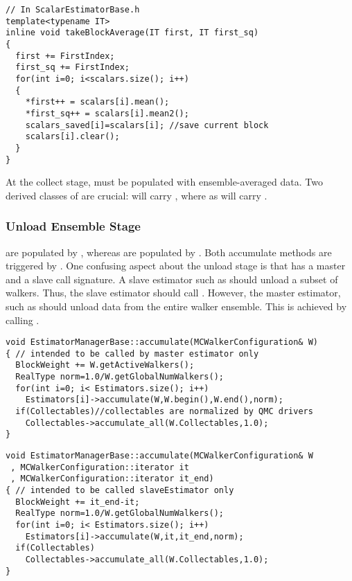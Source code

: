 \begin{lstlisting}
// In ScalarEstimatorBase.h
template<typename IT>
inline void takeBlockAverage(IT first, IT first_sq)
{
  first += FirstIndex;
  first_sq += FirstIndex;
  for(int i=0; i<scalars.size(); i++)
  {
    *first++ = scalars[i].mean();
    *first_sq++ = scalars[i].mean2();
    scalars_saved[i]=scalars[i]; //save current block
    scalars[i].clear();
  }
}
\end{lstlisting}

At the collect stage,  must be populated with ensemble-averaged data. Two derived classes of  are crucial:  will carry , where as  will carry .

\subsubsection{Unload Ensemble Stage}
 are populated by
, whereas
 are populated by
 . Both
accumulate methods are triggered by
. One confusing aspect about
the unload stage is that  has
a master and a slave call signature. A slave estimator such as
 should unload a subset of
walkers. Thus, the slave estimator should call
. However, the master estimator, such
as  should unload data from
the entire walker ensemble. This is achieved by calling
.

\begin{lstlisting}
void EstimatorManagerBase::accumulate(MCWalkerConfiguration& W)
{ // intended to be called by master estimator only
  BlockWeight += W.getActiveWalkers();
  RealType norm=1.0/W.getGlobalNumWalkers();
  for(int i=0; i< Estimators.size(); i++)
    Estimators[i]->accumulate(W,W.begin(),W.end(),norm);
  if(Collectables)//collectables are normalized by QMC drivers
    Collectables->accumulate_all(W.Collectables,1.0);
}
\end{lstlisting}

\begin{lstlisting}
void EstimatorManagerBase::accumulate(MCWalkerConfiguration& W
 , MCWalkerConfiguration::iterator it
 , MCWalkerConfiguration::iterator it_end)
{ // intended to be called slaveEstimator only
  BlockWeight += it_end-it;
  RealType norm=1.0/W.getGlobalNumWalkers();
  for(int i=0; i< Estimators.size(); i++)
    Estimators[i]->accumulate(W,it,it_end,norm);
  if(Collectables)
    Collectables->accumulate_all(W.Collectables,1.0);
}
\end{lstlisting}

